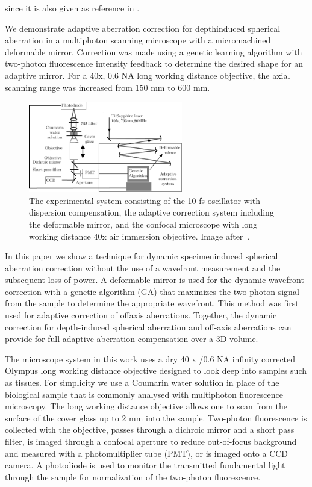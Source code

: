 \cite{Genetic_smart_algorithm} since it is also given as reference in \cite{Genetic_MPFM}. 

\cite{Genetic_MPFM}
We demonstrate adaptive aberration correction for depthinduced spherical aberration in a multiphoton scanning microscope with a micromachined deformable mirror. Correction was made using a genetic learning algorithm with two-photon fluorescence intensity feedback to determine the desired shape for an adaptive mirror. For a 40x, 0.6 NA long working distance objective, the axial scanning range was increased from 150 mm to 600 mm.

\begin{figure}[htbp]
	\centering
		\includegraphics[width=0.60\textwidth]{images/genetic_TPFM_setup.pdf}
	\caption{The experimental system consisting of the 10 fs oscillator with dispersion compensation, the adaptive correction system including the deformable mirror, and the confocal microscope with long working distance 40x air immersion objective. Image after~\cite{Genetic_MPFM}.}
	\label{fig:genetic_TPFM_setup}
\end{figure}


In this paper we show a technique for dynamic specimeninduced spherical aberration correction without the use of a wavefront measurement and the subsequent loss of power. A deformable mirror is used for the dynamic wavefront correction with a genetic algorithm (GA) that maximizes the two-photon signal from the sample to determine the appropriate wavefront. This method was first used for adaptive correction of offaxis aberrations\cite{Genetic_smart_algorithm}. Together, the dynamic correction for depth-induced spherical aberration and off-axis aberrations can provide for full adaptive aberration compensation over a 3D volume.

The microscope system in this work uses a dry 40 x /0.6 NA infinity corrected Olympus long working distance objective designed to look deep into samples such as tissues. For simplicity we use a Coumarin water solution in place of the biological sample that is commonly analysed with multiphoton fluorescence microscopy. The long working distance objective allows one to scan from the surface of the cover glass up to 2 mm into the sample. Two-photon fluorescence is collected with the objective, passes through a dichroic mirror and a short pass filter, is imaged through a confocal aperture to reduce out-of-focus background and measured with a photomultiplier tube (PMT), or is imaged onto a CCD camera. A photodiode is used to monitor the transmitted fundamental light through the sample for normalization of the two-photon fluorescence.

